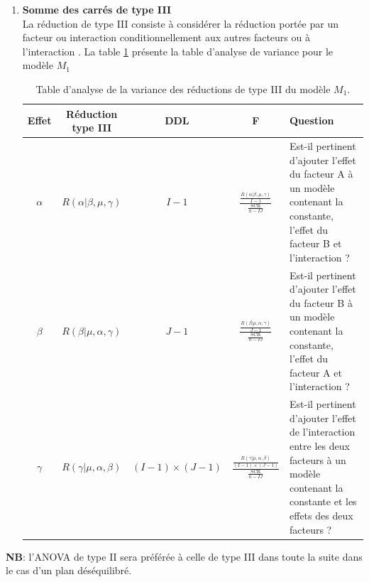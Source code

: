 \documentclass[12pt,a4paper]{article}
\begin{document}
\begin{enumerate}[label=\textbf{\alph*})]
		\item \textbf{Somme des carrés de type III}\\
		La réduction de type III consiste à considérer la réduction portée par un facteur ou interaction conditionnellement aux autres facteurs ou à l'interaction \cite{navarro2021}.
		La table \ref{ref:analyse_var_3} présente la table d'analyse de variance pour le modèle $M_1$
		\begin{table}[H]
			\centering
			\caption{Table d'analyse de la variance des réductions de type III du modèle $M_1$.}
			\begin{tabular}{|c|c|c|c|p{6cm}|}
				\hline
				\textbf{Effet} & \textbf{Réduction type III} & \textbf{DDL} & \textbf{F} & \textbf{Question} \\
				\hline
				$\alpha$ & $R(\alpha|\beta, \mu, \gamma)$ & $I-1$ & \LARGE{$\frac{\frac{R(\alpha|\beta, \mu, \gamma)}{I-1}}{\frac{\text{SCR}}{n-IJ}}$} & Est-il pertinent d'ajouter l'effet du facteur A à un modèle contenant la constante, l'effet du facteur B et l'interaction ? \\
				\hline
				$\beta$ & $R(\beta|\mu, \alpha, \gamma)$ & $J-1$ & \LARGE{$\frac{\frac{R(\beta|\mu, \alpha, \gamma)}{J-1}}{\frac{\text{SCR}}{n - IJ}}$} & Est-il pertinent d'ajouter l'effet du facteur B à un modèle contenant la constante, l'effet du facteur A et l'interaction ? \\
				\hline
				$\gamma$ & $R(\gamma|\mu, \alpha, \beta)$ & $(I-1) \times (J-1)$ & \LARGE{$\frac{\frac{R(\gamma|\mu, \alpha, \beta)}{(I-1) \times (J-1)}}{\frac{\text{SCR}}{n - IJ}}$} & Est-il pertinent d'ajouter l'effet de l'interaction entre les deux facteurs à un modèle contenant la constante et les effets des deux facteurs ? \\
				\hline
			\end{tabular}
			\label{ref:analyse_var_3}
		\end{table}
	
	\end{enumerate}
	
	\textbf{NB}: l'ANOVA de type II sera préférée à celle de type III dans toute la suite dans le cas d'un plan déséquilibré.
	
\end{document}
